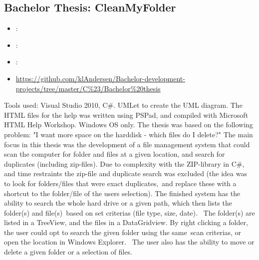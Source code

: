 \subsection{Bachelor Thesis: CleanMyFolder}
\label{sec:bach_thesis}
\begin{itemize} 
	\item {}: 
	\item {}: 
	\item {}: 
	\item {} \url{https://github.com/klAndersen/Bachelor-development-projects/tree/master/C%23/Bachelor%20thesis}
\end{itemize} 
Tools used: Visual Studio 2010, C\#. UMLet to create the UML diagram. 
The HTML files for the help was written using PSPad, and compiled with Microsoft HTML Help Workshop. Windows OS only.
\vspace{0.5em}\newline
The thesis was based on the following problem: "I want more space on the harddisk - which files do I delete?" 
The main focus in this thesis was the development of a file management system that could scan the computer for folder and files at a given location, 
and search for duplicates (including zip-files).
\vspace{0.5em}\newline
Due to complexity with the ZIP-library in C\#, and time restraints the zip-file and duplicate search was excluded 
(the idea was to look for folders/files that were exact duplicates, and replace these with a shortcut to the folder/file of the users selection). 
The finished system has the ability to search the whole hard drive or a given path, which then lists the folder(s) and file(s) based on set criterias (file type, size, date). 
\vspace{0.5em}\newline
The folder(s) are listed in a TreeView, and the files in a DataGridview. 
By right clicking a folder, the user could opt to search the given folder using the same scan criterias, or open the location in Windows Explorer. 
The user also has the ability to move or delete a given folder or a selection of files.

